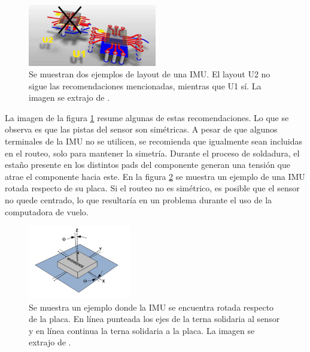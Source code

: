 \begin{figure}[htb]
    \centering
    \includegraphics[width=0.5\textwidth]{img/IMU_recomendaciones_layout.png}
    \caption{Se muestran dos ejemplos de layout de una IMU. El layout U2 no sigue las recomendaciones mencionadas, mientras que U1 sí. La imagen se extrajo de \cite{IMUpcb_3}.}
    \label{fig:IMU_recomendaciones_layout}
\end{figure}

La imagen de la figura \ref{fig:IMU_recomendaciones_layout} resume algunas de estas recomendaciones. Lo que se observa es que las pistas del sensor son simétricas. A pesar de que algunos terminales de la IMU no se utilicen, se recomienda que igualmente sean incluidas en el routeo, solo para mantener la simetría. Durante el proceso de soldadura, el estaño presente en los distintos pads del componente generan una tensión que atrae el componente hacia este. En la figura \ref{fig:IMU_missalignment} se muestra un ejemplo de una IMU rotada respecto de su placa. Si el routeo no es simétrico, es posible que el sensor no quede centrado, lo que resultaría en un problema durante el uso de la computadora de vuelo.

\begin{figure}[htb]
    \centering
    \includegraphics[width=0.4\textwidth]{img/IMU_missalignment.png}
    \caption{Se muestra un ejemplo donde la IMU se encuentra rotada respecto de la placa. En línea punteada los ejes de la terna solidaria al sensor y en línea continua la terna solidaria a la placa. La imagen se extrajo de \cite{IMUpcb_4}.}
    \label{fig:IMU_missalignment}
\end{figure}


